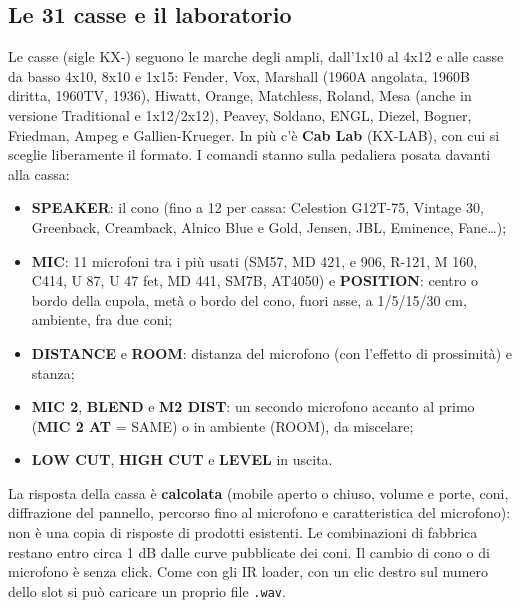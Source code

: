 \documentclass[11pt,a4paper]{article}
\begin{document}
\subsection*{Le 31 casse e il laboratorio}
Le casse (sigle KX-) seguono le marche degli ampli, dall'1x10 al 4x12 e alle casse da basso 4x10, 8x10 e 1x15:
Fender, Vox, Marshall (1960A angolata, 1960B diritta, 1960TV, 1936), Hiwatt, Orange, Matchless, Roland, Mesa
(anche in versione Traditional e 1x12/2x12), Peavey, Soldano, ENGL, Diezel, Bogner, Friedman, Ampeg e
Gallien-Krueger. In più c'è \textbf{Cab Lab} (KX-LAB), con cui si sceglie liberamente il formato.
I comandi stanno sulla pedaliera posata davanti alla cassa:
\begin{itemize}
  \item \textbf{SPEAKER}: il cono (fino a 12 per cassa: Celestion G12T-75, Vintage 30, Greenback, Creamback,
        Alnico Blue e Gold, Jensen, JBL, Eminence, Fane\dots);
  \item \textbf{MIC}: 11 microfoni tra i più usati (SM57, MD 421, e 906, R-121, M 160, C414, U 87, U 47 fet,
        MD 441, SM7B, AT4050) e \textbf{POSITION}: centro o bordo della cupola, metà o bordo del cono, fuori asse,
        a 1/5/15/30 cm, ambiente, fra due coni;
  \item \textbf{DISTANCE} e \textbf{ROOM}: distanza del microfono (con l'effetto di prossimità) e stanza;
  \item \textbf{MIC 2}, \textbf{BLEND} e \textbf{M2 DIST}: un secondo microfono accanto al primo
        (\textbf{MIC 2 AT} = SAME) o in ambiente (ROOM), da miscelare;
  \item \textbf{LOW CUT}, \textbf{HIGH CUT} e \textbf{LEVEL} in uscita.
\end{itemize}
La risposta della cassa è \textbf{calcolata} (mobile aperto o chiuso, volume e porte, coni, diffrazione del
pannello, percorso fino al microfono e caratteristica del microfono): non è una copia di risposte di prodotti
esistenti. Le combinazioni di fabbrica restano entro circa 1 dB dalle curve pubblicate dei coni. Il cambio di
cono o di microfono è senza click. Come con gli IR loader, con un clic destro sul numero dello slot si può caricare un
proprio file \texttt{.wav}.

\end{document}
